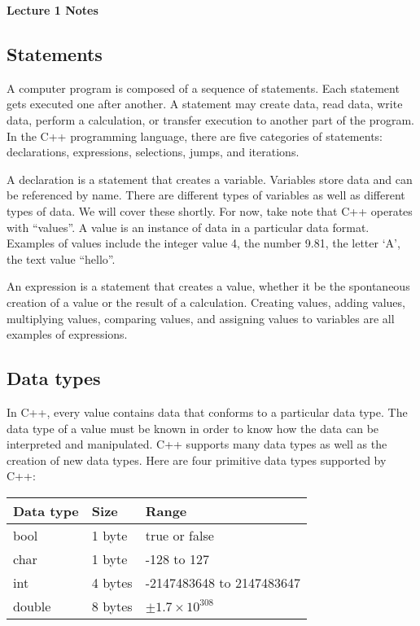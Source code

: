 \documentclass[a4paper,12pt]{article}
\begin{document}
\lstset{frame=single,tabsize=4,basicstyle=\ttfamily}

{\centering \bf \Large
Lecture 1 Notes \\[\baselineskip]
}

\subsection*{Statements}

A computer program is composed of a sequence of statements. Each statement gets executed one after another. A statement may create data, read data, write data, perform a calculation, or transfer execution to another part of the program. In the C++ programming language, there are five categories of statements: declarations, expressions, selections, jumps, and iterations. 

A declaration is a statement that creates a variable. Variables store data and can be referenced by name. There are different types of variables as well as different types of data. We will cover these shortly. For now, take note that C++ operates with ``values''. A value is an instance of data in a particular data format. Examples of values include the integer value 4, the number 9.81, the letter `A', the text value ``hello''. 

An expression is a statement that creates a value, whether it be the spontaneous creation of a value or the result of a calculation. Creating values, adding values, multiplying values, comparing values, and assigning values to variables are all examples of expressions.

\subsection*{Data types}

In C++, every value contains data that conforms to a particular data type. The data type of a value must be known in order to know how the data can be interpreted and manipulated. C++ supports many data types as well as the creation of new data types. Here are four primitive data types supported by C++: \\

\begin{tabular}{|l|l|l|}
\hline
{\bf Data type} & {\bf Size} & {\bf Range} \\
\hline
bool & 1 byte & true or false \\
\hline
char & 1 byte & -128 to 127 \\
\hline
int & 4 bytes & -2147483648 to 2147483647 \\
\hline
double & 8 bytes & $\pm1.7 \times 10^{308}$ \\
\hline
\end{tabular} \\
\end{document}
